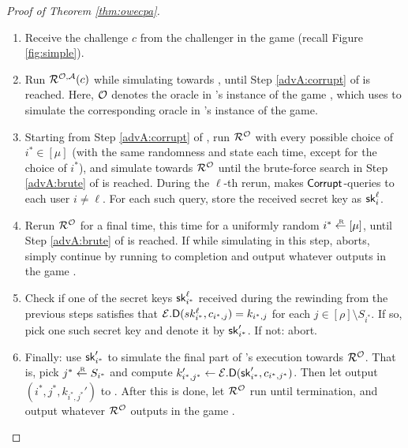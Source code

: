 \begin{proof}[Proof of Theorem \ref{thm:owecpa}]
  \begin{enumerate}[itemsep=0.1cm]
    \item Receive the challenge \(c\) from the challenger in the game \SICA (recall Figure \ref{fig:simple}).
    \item Run \(\redR^{\oracle,\advA}(c)\) while simulating \advA towards \redR,
          until Step \ref{advA:corrupt} of \advA is reached.
          Here, \(\mathcal{O}\) denotes the oracle in \redM's instance of the game \SICA,
          which \redM uses to simulate the corresponding oracle in \redR's instance of the game.
    \item\label{advM:rewind} Starting from Step \ref{advA:corrupt} of \advA, run \(\redR^{\oracle}\) with every possible choice of \(i^{*} \in [\mu]\)
          (with the same randomness and state each time, except for the choice of \(i^{*}\)),
          and simulate \advA towards \(\redR^{\oracle}\)
          until the brute-force search in Step \ref{advA:brute} of \advA is reached.
          During the \(\ell\)-th rerun, \advA makes \(\mathsf{Corrupt}\)-queries to each user \(i \ne \ell\).
          For each such query, store the received secret key as \(\mathsf{sk}_{i}^{\ell}\).
    \item\label{advM:sample} Rerun \(\redR^{\oracle}\) for a final time, this time for a uniformly random \(i^{*} \sampleR [\mu]\),
          until Step \ref{advA:brute} of \advA is reached.
          If while simulating \advA in this step, \advA aborts,
          simply continue by running \redR to completion
          and output whatever \redR outputs in the game \SICA.
    \item\label{advM:key} Check if one of the secret keys \(\mathsf{sk}_{i^{*}}^{\ell}\) received during the rewinding
          from the previous steps satisfies that
          \(\mathcal{E}.\mathsf{D}(sk_{i^{*}}^{\ell},c_{i^{*},j}) = k_{i^{*},j}\)
          for each \(j \in [\rho] \setminus S_{i^{*}}\).
          If so, pick one such secret key and denote it by \(\mathsf{sk}_{i^{*}}'\).
          If not: abort.
    \item Finally: use \(\mathsf{sk}_{i^{*}}'\) to simulate the final part of \advA's execution towards \(\redR^{\oracle}\).
          That is, pick \(j^{*} \sampleR S_{i^{*}}\)
          and compute \(k_{i^{*},j^{*}}' \leftarrow \mathcal{E}.\mathsf{D}(\mathsf{sk}_{i^{*}}',c_{i^{*},j^{*}})\).
          Then let \advA output \((i^{*},j^{*}, k_{i^{*},j^{*}}')\) to \redR.
          After this is done, let \(\redR^{\oracle}\) run until termination,
          and output whatever \(\redR^{\oracle}\) outputs in the game \SICA.
  \end{enumerate}


\end{proof}
